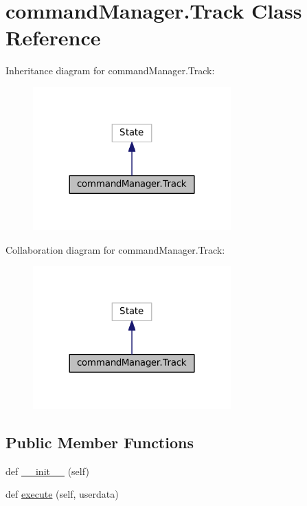 \hypertarget{classcommandManager_1_1Track}{}\section{command\+Manager.\+Track Class Reference}
\label{classcommandManager_1_1Track}


Inheritance diagram for command\+Manager.\+Track\+:\nopagebreak
\begin{figure}[H]
\begin{center}
\leavevmode
\includegraphics[width=216pt]{classcommandManager_1_1Track__inherit__graph}
\end{center}
\end{figure}


Collaboration diagram for command\+Manager.\+Track\+:\nopagebreak
\begin{figure}[H]
\begin{center}
\leavevmode
\includegraphics[width=216pt]{classcommandManager_1_1Track__coll__graph}
\end{center}
\end{figure}
\subsection*{Public Member Functions}
\begin{DoxyCompactItemize}
\item 
def \hyperlink{classcommandManager_1_1Track_af204111942c1cc2b65ff7b68a74c2420}{\+\_\+\+\_\+init\+\_\+\+\_\+} (self)
\item 
def \hyperlink{classcommandManager_1_1Track_a58dac1ae26362ef259735b950e35e237}{execute} (self, userdata)
\end{DoxyCompactItemize}
